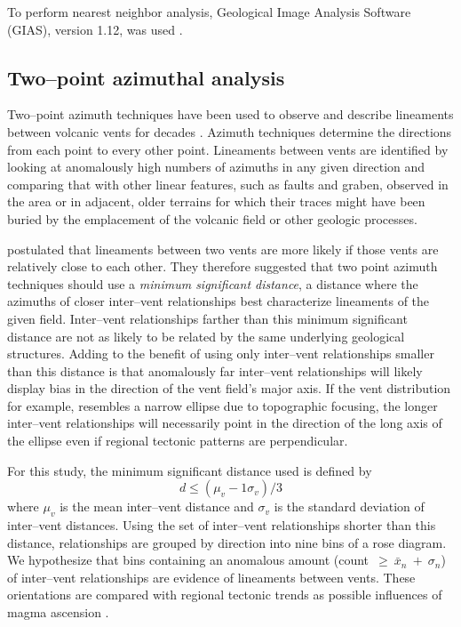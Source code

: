 To perform nearest neighbor analysis, Geological Image Analysis Software (GIAS), version 1.12, was used \citep{Beggan2010,Hamilton2010,Hamilton2011}.

\subsection{Two--point azimuthal analysis}
\label{sec:methodAzimuth}

Two--point azimuth techniques have been used to observe and describe lineaments between volcanic vents for decades \citep{Lutz1986,Wadge1988,Wadge1989,connor1990cinder,lutz1995improved,bleacher2009spatial,Cebria2011,Roberts2011}. Azimuth techniques determine the directions from each point to every other point. Lineaments between vents are identified by looking at anomalously high numbers of azimuths in any given direction and comparing that with other linear features, such as faults and graben, observed in the area or in adjacent, older terrains for which their traces might have been buried by the emplacement of the volcanic field or other geologic processes.

\citet{Cebria2011} postulated that lineaments between two vents are more likely if those vents are relatively close to each other. They therefore suggested that two point azimuth techniques should use a \textit{minimum significant distance}, a distance where the azimuths of closer inter--vent relationships best characterize lineaments of the given field. Inter--vent relationships farther than this minimum significant distance are not as likely to be related by the same underlying geological structures. Adding to the benefit of using only inter--vent relationships smaller than this distance is that anomalously far inter--vent relationships will likely display bias in the direction of the vent field's major axis. If the vent distribution for example, resembles a narrow ellipse due to topographic focusing, the longer inter--vent relationships will necessarily point in the direction of the long axis of the ellipse even if regional tectonic patterns are perpendicular.

For this study, the minimum significant distance used is defined by \citet{Cebria2011}
\begin{equation}
d \le (\mu_v - 1\sigma_v) / 3 \label{eq5}
\end{equation}
where $\mu_v$ is the mean inter--vent distance and $\sigma_v$ is the standard deviation of inter--vent distances. Using the set of inter--vent relationships shorter than this distance, relationships are grouped by direction into nine bins of a rose diagram. We hypothesize that bins containing an anomalous amount (count~$\ge~\bar{x}_n~+~\sigma_n$) of inter--vent relationships are evidence of lineaments between vents. These orientations are compared with regional tectonic trends as possible influences of magma ascension \citep{bleacher2009spatial,Cebria2011}.


